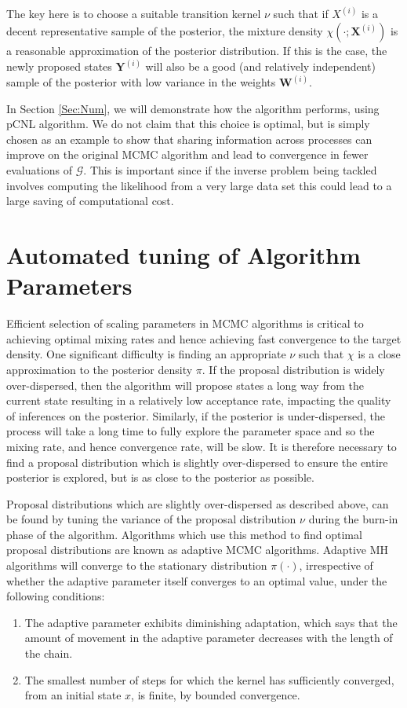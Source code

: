 \documentclass[final]{siamltex}
\newcommand{\G}{\mathcal{G}}
\newcommand{\X}{{\mathbf X}}
\newcommand{\Y}{{\mathbf Y}}
\newcommand{\W}{{\mathbf W}}
\begin{document}
The key here is to choose a suitable transition kernel $\nu$ such that
if $X^{(i)}$ is a decent representative sample of the posterior,
the mixture density $\chi(\cdot;\X^{(i)})$ is a reasonable
approximation of the posterior distribution. If this is the case,
the newly proposed states $\Y^{(i)}$ will also be a good (and relatively
independent) sample of the posterior with low variance in the
weights $\W^{(i)}$.

In Section \ref{Sec:Num}, we will demonstrate how the algorithm
performs, using pCNL algorithm. We do not claim that this choice is optimal, but
is simply chosen as an example to show that sharing information across
processes can improve on the original MCMC algorithm and lead to
convergence in fewer evaluations of $\G$. This is important since if
the inverse problem being tackled involves computing
the likelihood from a very large data set this could lead to a
large saving of computational cost.

\section{Automated tuning of Algorithm Parameters}\label{Sec:adapt}

Efficient selection of scaling parameters in MCMC algorithms is critical to achieving optimal mixing rates and hence achieving fast convergence to the target density. One significant difficulty is finding an appropriate $\nu$ such that
$\chi$ is a close approximation to the posterior density $\pi$. If the proposal distribution is widely over-dispersed, then the algorithm will propose states a long way from the current state resulting in a relatively low acceptance rate, impacting the quality of inferences on the posterior. Similarly, if the posterior is under-dispersed, the process will take a long time to fully explore the parameter space and so the mixing rate, and hence convergence rate, will be slow. It is therefore necessary to find a proposal distribution which is slightly over-dispersed to ensure the entire posterior is explored\cite{gelman1992inference}, but is as close to the posterior as possible.

Proposal distributions which are slightly over-dispersed as described
above, can be found by tuning the variance of the proposal
distribution $\nu$ during the burn-in phase of the
algorithm. Algorithms which use this method to find optimal proposal
distributions are known as adaptive MCMC algorithms. Adaptive MH
algorithms will converge to the stationary distribution $\pi(\cdot)$,
irrespective of whether the adaptive parameter itself converges to an
optimal value, under the following
conditions\cite{roberts2007coupling,roberts2009examples}: 
\begin{enumerate}
\item The adaptive parameter exhibits diminishing adaptation, which says that the amount of movement in the adaptive parameter decreases with the length of the chain. 
\item The smallest number of steps for which the kernel has sufficiently converged, from an initial state $x$, is finite, by bounded convergence.
\end{enumerate}
\end{document}
